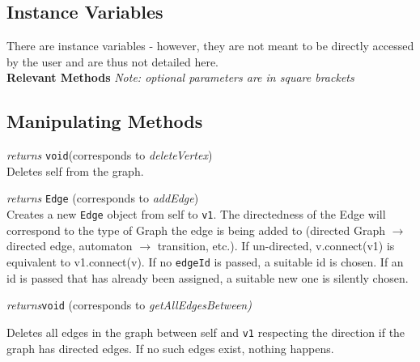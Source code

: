 \documentclass{article}
\newlength\q
\begin{document}
\subsection{Instance Variables}
There are instance variables - however, they are not meant to be directly accessed by the user and are thus not detailed here.\\

\textbf{{\large Relevant Methods}}
\textit{Note: optional parameters are in square brackets}
\subsection{Manipulating Methods}
\begin{description}
\label{deleteVertexClass}\item[delete()] \emph{returns} \texttt{void}(corresponds to \textit{deleteVertex})\\
Deletes self from the graph.

\label{addEdgeClass}\item[connect(Vertex: v1, {[Integer: edgeId]})] \emph{returns} \texttt{Edge} (corresponds to \textit{addEdge})\\
Creates a new \texttt{Edge} object from self to \texttt{v1}. The directedness of the Edge will correspond to the type of Graph the edge is being added to (directed Graph $\to$ directed edge, automaton $\to$ transition, etc.). If un-directed, v.connect(v1) is equivalent to v1.connect(v). If no \texttt{edgeId}
is passed, a suitable id is chosen. If an id is passed that has
already been assigned, a suitable new one is silently chosen.

\label{getAllEdgesBetweenClass}\item[getAllEdgesBetween(Vertex: v1)] \emph{returns}\texttt{void} (corresponds to \textit{getAllEdgesBetween)}

Deletes all edges in the graph
between self and \texttt{v1} respecting
the direction if the graph has directed edges.
If no such edges exist, nothing happens.


\end{description}
\end{document}
